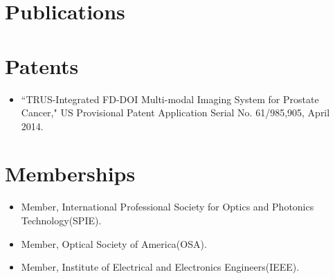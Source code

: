 \documentclass{my_cv}
\begin{document}
\section{{Publications}} 
\printbibliography[title={Journal Publications},type=article,heading=subbibliography,resetnumbers=true]
\printbibliography[title={Conference Publications},type=inproceedings,heading=subbibliography,resetnumbers=true]


\vspace{-5mm} %


\section{{Patents}} 

\vspace{-2mm} %
\begin{itemize} \itemsep -2pt %
\item ``TRUS-Integrated FD-DOI Multi-modal Imaging System for Prostate Cancer," US Provisional Patent Application Serial No. 61/985,905, April 2014. 
\end{itemize}



\vspace{-5mm} %


\section{{Memberships}} 

\vspace{-2mm} %

\begin{itemize} \itemsep -2pt 
\item Member, International Professional Society for Optics and Photonics Technology(SPIE).
\item Member, Optical Society of America(OSA). 
\item Member, Institute of Electrical and Electronics Engineers(IEEE). 
\end{itemize}


\let\thefootnote\relax{}
\end{document}
